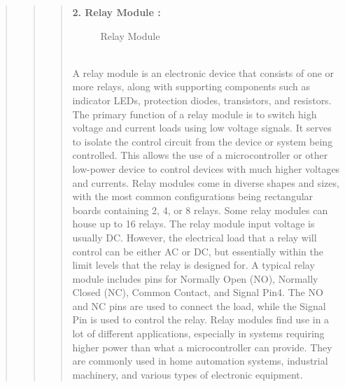 \documentclass[12pt]{report}
\begin{document}
\begin{quote}
\begin{quote}
			\begin{quote}
				\textbf{2. Relay Module :}
				\begin{figure}[htbp]
					\centering
					\caption{Relay Module}
				\end{figure}
				\\A relay module is an electronic device that consists of one or more relays, along with supporting components such as indicator LEDs, protection diodes, transistors, and resistors. The primary function of a relay module is to switch high voltage and current loads using low voltage signals. It serves to isolate the control circuit from the device or system being controlled. This allows the use of a microcontroller or other low-power device to control devices with much higher voltages and currents. Relay modules come in diverse shapes and sizes, with the most common configurations being rectangular boards containing 2, 4, or 8 relays. Some relay modules can house up to 16 relays. The relay module input voltage is usually DC. However, the electrical load that a relay will control can be either AC or DC, but essentially within the limit levels that the relay is designed for. A typical relay module includes pins for Normally Open (NO), Normally Closed (NC), Common Contact, and Signal Pin4. The NO and NC pins are used to connect the load, while the Signal Pin is used to control the relay. Relay modules find use in a lot of different applications, especially in systems requiring higher power than what a microcontroller can provide. They are commonly used in home automation systems, industrial machinery, and various types of electronic equipment.
			\end{quote}
			

\end{quote}
\end{quote}
\end{document}
